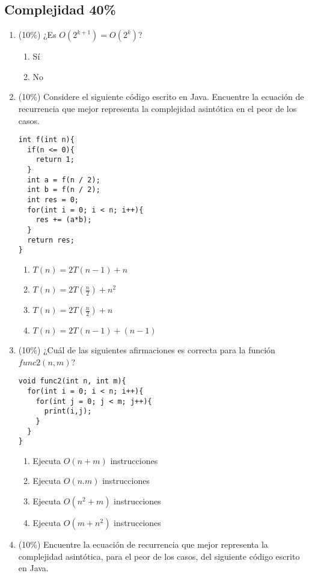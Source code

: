 \documentclass[10 pt]{article}
\begin{document}
\begin{multicols}{2}
\section{Complejidad 40\%}
\begin{enumerate}[label=(\alph*)]
\item (10\%) ¿Es $O(2^{k + 1})=O(2^k)$?
\begin{enumerate}[label=(\roman*)]
\item Sí
\item No
\end{enumerate}
\item (10\%) Considere el siguiente código escrito en Java. Encuentre la ecuación de recurrencia que mejor representa la complejidad asintótica en el peor de los casos.
\begin{lstlisting}
int f(int n){
  if(n <= 0){
    return 1;
  }
  int a = f(n / 2);
  int b = f(n / 2);
  int res = 0;
  for(int i = 0; i < n; i++){
    res += (a*b);
  }
  return res;
}
\end{lstlisting}
\begin{enumerate}[label=(\roman*)]
	\item $T(n) = 2T(n-1) + n$
	\item $T(n) = 2T(\frac{n}{2}) + n^2$
	\item $T(n) = 2T(\frac{n}{2}) + n$
	\item $T(n) = 2T(n-1) + (n-1)$
\end{enumerate}
\item (10\%) ¿Cuál de las siguientes afirmaciones es correcta para la función $func2(n, m)$?
\begin{lstlisting}
void func2(int n, int m){
  for(int i = 0; i < n; i++){
    for(int j = 0; j < m; j++){
      print(i,j);   
    }  
  }
}
\end{lstlisting}
\begin{enumerate}[label=(\roman*)]
\item Ejecuta $O(n + m)$ instrucciones
\item Ejecuta $O(n . m)$ instrucciones
\item Ejecuta $O(n^2 + m)$ instrucciones
\item Ejecuta $O(m + n^2)$ instrucciones
\end{enumerate}
\pagebreak
\item (10\%) Encuentre la ecuación de recurrencia que mejor representa la complejidad asintótica, para el peor de los casos, del siguiente código escrito en Java.
\begin{lstlisting}

\end{lstlisting}
\end{enumerate}
\end{multicols}
\end{document}
